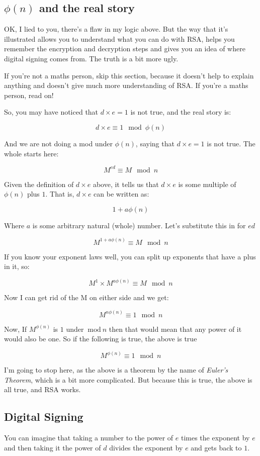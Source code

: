 \documentclass{article}
\newcommand{\inmod}{\ \text{mod}\ }
\begin{document}
  \subsection*{$\phi(n)$ and the real story}
  OK, I lied to you, there's a flaw in my logic above. But the way that it's 
  illustrated allows you to understand what you can do with RSA, helps you
  remember the encryption and decryption steps and gives you an idea of where
  digital signing comes from. The truth is a bit more ugly.

  If you're not a maths person, skip this section, because it doesn't help to
  explain anything and doesn't give much more understanding of RSA. If you're
  a maths person, read on!

  So, you may have noticed that $d \times e = 1$ is not true, and the real story
  is:

  \[ d \times e \equiv 1 \mod \phi(n) \]

  And we are not doing a mod under $\phi(n)$, saying that $d \times e = 1$ is
  not true. The whole starts here:

  \[ M^{ed} \equiv M \mod n \]

  Given the definition of $d \times e$ above, it tells us that $d \times e$ is
  some multiple of $\phi(n)$ plus $1$. That is, $d \times e$ can be written as:

  \[ 1 + a\phi(n) \]
  
  Where $a$ is some arbitrary natural (whole) number. Let's substitute this in for $ed$

  \[ M^{1 + a\phi(n)} \equiv M \mod n \]

  If you know your exponent laws well, you can split up exponents that have a 
  plus in it, so:

  \[ M^{1} \times M^{a\phi(n)} \equiv M \mod n \]

  Now I can get rid of the M on either side and we get:

  \[ M^{n\phi(n)} \equiv 1 \mod n \]

  Now, If $M^{\phi(n)}$ is $1$ under $\inmod n$ then that would mean that any 
  power of it would also be one. So if the following is true, the above is true

  \[ M^{\phi(n)} \equiv 1 \mod n \]

  I'm going to stop here, as the above is a theorem by the name of 
  \textit{Euler's Theorem}, which is a bit more complicated. But because this
  is true, the above is all true, and RSA works.

  \subsection*{Digital Signing}
  You can imagine that taking a number to the power of $e$ times the exponent by
  $e$ and then taking it the power of $d$ divides the exponent by $e$ and gets
  back to $1$.
\end{document}
